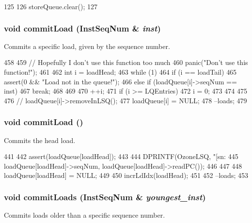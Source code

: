 \begin{DoxyCode}
125 {
126     storeQueue.clear();
127 }
\end{DoxyCode}
\hypertarget{classOzoneLSQ_a1201888477c271cea802f0be0081d76b}{
\subsubsection[{commitLoad}]{\setlength{\rightskip}{0pt plus 5cm}void commitLoad ({\bf InstSeqNum} \& {\em inst})}}
\label{classOzoneLSQ_a1201888477c271cea802f0be0081d76b}
Commits a specific load, given by the sequence number. 


\begin{DoxyCode}
458 {
459     // Hopefully I don't use this function too much
460     panic("Don't use this function!");
461 
462     int i = loadHead;
463     while (1) {
464         if (i == loadTail) {
465             assert(0 && "Load not in the queue!");
466         } else if (loadQueue[i]->seqNum == inst) {
467             break;
468         }
469 
470         ++i;
471         if (i >= LQEntries) {
472             i = 0;
473         }
474     }
475 
476 //    loadQueue[i]->removeInLSQ();
477     loadQueue[i] = NULL;
478     --loads;
479 }
\end{DoxyCode}
\hypertarget{classOzoneLSQ_a8ddd26e169a62ec5ae591a9f95934839}{
\subsubsection[{commitLoad}]{\setlength{\rightskip}{0pt plus 5cm}void commitLoad ()}}
\label{classOzoneLSQ_a8ddd26e169a62ec5ae591a9f95934839}
Commits the head load. 


\begin{DoxyCode}
441 {
442     assert(loadQueue[loadHead]);
443 
444     DPRINTF(OzoneLSQ, "[sn:%
445             loadQueue[loadHead]->seqNum, loadQueue[loadHead]->readPC());
446 
447 
448     loadQueue[loadHead] = NULL;
449 
450     incrLdIdx(loadHead);
451 
452     --loads;
453 }
\end{DoxyCode}
\hypertarget{classOzoneLSQ_a1ae517a923a864a4e3a5aa1eeb2dd2d6}{
\subsubsection[{commitLoads}]{\setlength{\rightskip}{0pt plus 5cm}void commitLoads ({\bf InstSeqNum} \& {\em youngest\_\-inst})}}
\label{classOzoneLSQ_a1ae517a923a864a4e3a5aa1eeb2dd2d6}
Commits loads older than a specific sequence number. 


